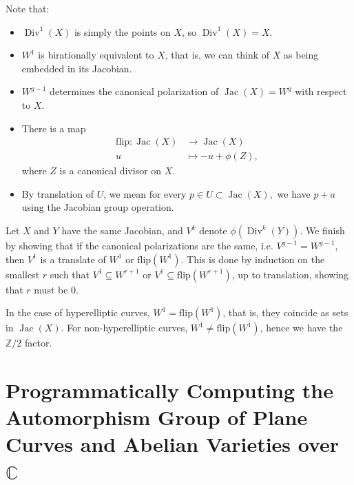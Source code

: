 \documentclass[12pt,reqno]{amsart}
\DeclareMathOperator{\Jac}{Jac}
\DeclareMathOperator{\Div}{Div}
\newcommand{\Z}{\mathbb{Z}}
\theoremstyle{definition}
\theoremstyle{remark}
\newcommand{\ti}{\todo[inline]}
\begin{document}

Note that: 

\begin{itemize} 
\item $\Div^1(X)$ is simply the points on $X$, so  $\Div^1(X) = X$.

\item $W^1$ is birationally equivalent to $X$, that is, we can think of $X$ as being embedded in its Jacobian. 

\item  $W^{g-1}$ determines the canonical polarization of $\Jac(X) = W^g$ with respect to $X$.  

\item There is a map \begin{align*}
\text{flip}: \Jac(X) &\to \Jac(X)\\
u &\mapsto -u + \phi(Z),
\end{align*}
where $Z$ is a canonical divisor on $X$.
\item By translation of $U$, we mean for every $p \in U \subset \Jac(X),$ we have $p+a$ using the Jacobian group operation.
\end{itemize} 

Let $X$ and $Y$ have the same Jacobian, and $V^{k}$ denote $\phi(\Div^k(Y))$. We finish by showing that if the canonical polarizations are the same, i.e. $V^{g-1} = W^{g-1}$, then $V^1$ is a translate of $W^1$ or $\text{flip}(W^1)$. This is done by induction on the smallest $r$ such that $V^1 \subseteq W^{r+1}$ or $V^1 \subseteq \text{flip}(W^{r+1})$, up to translation, showing that $r$ must be 0.


 In the case of hyperelliptic curves, $W^1 = \text{flip}(W^1)$, that is, they coincide as sets in $\Jac(X)$. For non-hyperelliptic curves, $W^1 \neq \text{flip}(W^1)$, hence we have the $\Z/2$ factor. 




 \section{Programmatically Computing the Automorphism Group of Plane Curves and Abelian Varieties over $\mathbb{C}$}
\end{document}
